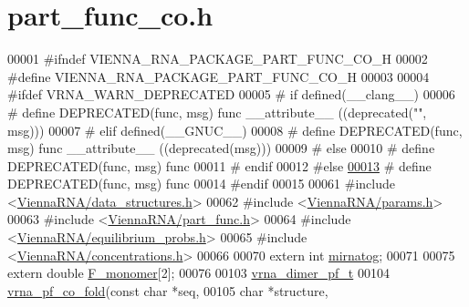 \hypertarget{part__func__co_8h_source}{}\section{part\+\_\+func\+\_\+co.\+h}
\label{part__func__co_8h_source}

\begin{DoxyCode}
00001 \textcolor{preprocessor}{#ifndef VIENNA\_RNA\_PACKAGE\_PART\_FUNC\_CO\_H}
00002 \textcolor{preprocessor}{#define VIENNA\_RNA\_PACKAGE\_PART\_FUNC\_CO\_H}
00003 
00004 \textcolor{preprocessor}{#ifdef VRNA\_WARN\_DEPRECATED}
00005 \textcolor{preprocessor}{# if defined(\_\_clang\_\_)}
00006 \textcolor{preprocessor}{#  define DEPRECATED(func, msg) func \_\_attribute\_\_ ((deprecated("", msg)))}
00007 \textcolor{preprocessor}{# elif defined(\_\_GNUC\_\_)}
00008 \textcolor{preprocessor}{#  define DEPRECATED(func, msg) func \_\_attribute\_\_ ((deprecated(msg)))}
00009 \textcolor{preprocessor}{# else}
00010 \textcolor{preprocessor}{#  define DEPRECATED(func, msg) func}
00011 \textcolor{preprocessor}{# endif}
00012 \textcolor{preprocessor}{#else}
\mbox{\hyperlink{part__func__co_8h_aab347a3c03fbe8e7319551b9fa0cce4a}{00013}} \textcolor{preprocessor}{# define DEPRECATED(func, msg) func}
00014 \textcolor{preprocessor}{#endif}
00015 
00061 \textcolor{preprocessor}{#include <\mbox{\hyperlink{data__structures_8h}{ViennaRNA/data\_structures.h}}>}
00062 \textcolor{preprocessor}{#include <\mbox{\hyperlink{params_8h}{ViennaRNA/params.h}}>}
00063 \textcolor{preprocessor}{#include <\mbox{\hyperlink{part__func_8h}{ViennaRNA/part\_func.h}}>}
00064 \textcolor{preprocessor}{#include <\mbox{\hyperlink{equilibrium__probs_8h}{ViennaRNA/equilibrium\_probs.h}}>}
00065 \textcolor{preprocessor}{#include <\mbox{\hyperlink{concentrations_8h}{ViennaRNA/concentrations.h}}>}
00066 
00070 \textcolor{keyword}{extern} \textcolor{keywordtype}{int}    \mbox{\hyperlink{group__pf__cofold_gaff27888c4088cc1f60fd59cbd589474c}{mirnatog}};
00071 
00075 \textcolor{keyword}{extern} \textcolor{keywordtype}{double} \mbox{\hyperlink{group__pf__cofold_gac2d1851a710a8561390861155ca988fe}{F\_monomer}}[2];
00076 
00103 \mbox{\hyperlink{group__pf__cofold_structvrna__dimer__pf__s}{vrna\_dimer\_pf\_t}}
00104 \mbox{\hyperlink{group__pf__cofold_gaf2b846f7ac382686f35ff7b9202fdd5c}{vrna\_pf\_co\_fold}}(\textcolor{keyword}{const} \textcolor{keywordtype}{char}  *seq,
00105                 \textcolor{keywordtype}{char}        *structure,

\end{DoxyCode}
